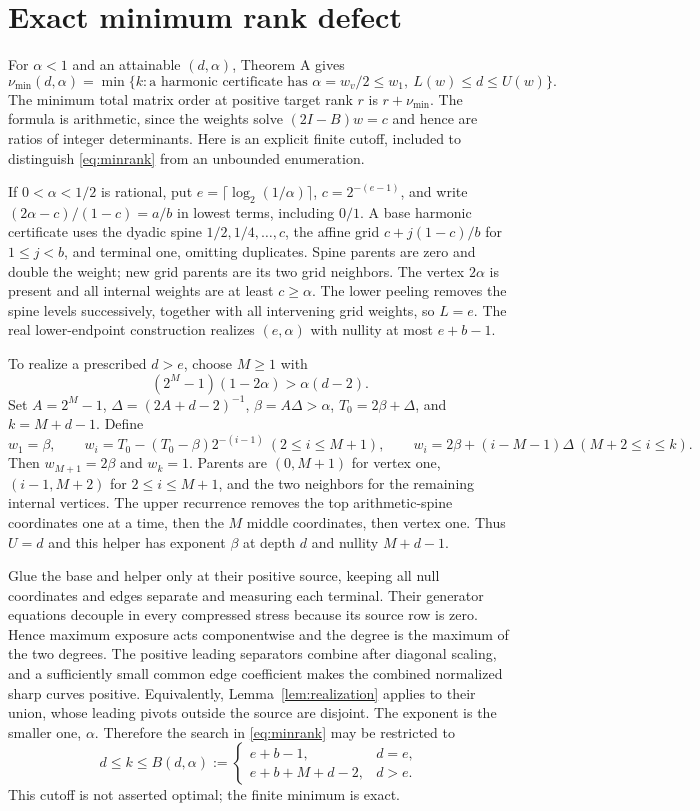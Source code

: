 \section{Exact minimum rank defect}\label{app:minimum}
For $\alpha<1$ and an attainable $(d,\alpha)$, Theorem A gives
\begin{equation}\label{eq:minrank}
\nu_{\min}(d,\alpha)=\min\{k:\text{a harmonic certificate has }
\alpha=w_v/2\le w_1,\ L(w)\le d\le U(w)\}.
\end{equation}
The minimum total matrix order at positive target rank $r$ is $r+\nu_{\min}$. The formula is arithmetic, since the weights solve $(2I-B)w=c$ and hence are ratios of integer determinants. Here is an explicit finite cutoff, included to distinguish \eqref{eq:minrank} from an unbounded enumeration.

If $0<\alpha<1/2$ is rational, put $e=\lceil\log_2(1/\alpha)\rceil$, $c=2^{-(e-1)}$, and write $(2\alpha-c)/(1-c)=a/b$ in lowest terms, including $0/1$. A base harmonic certificate uses the dyadic spine $1/2,1/4,\ldots,c$, the affine grid $c+j(1-c)/b$ for $1\le j<b$, and terminal one, omitting duplicates. Spine parents are zero and double the weight; new grid parents are its two grid neighbors. The vertex $2\alpha$ is present and all internal weights are at least $c\ge\alpha$. The lower peeling removes the spine levels successively, together with all intervening grid weights, so $L=e$. The real lower-endpoint construction realizes $(e,\alpha)$ with nullity at most $e+b-1$.

To realize a prescribed $d>e$, choose $M\ge1$ with
\[
(2^M-1)(1-2\alpha)>\alpha(d-2).
\]
Set $A=2^M-1$, $\Delta=(2A+d-2)^{-1}$, $\beta=A\Delta>\alpha$, $T_0=2\beta+\Delta$, and $k=M+d-1$. Define
\[
w_1=\beta,\qquad
w_i=T_0-(T_0-\beta)2^{-(i-1)}\ (2\le i\le M+1),
\qquad
w_i=2\beta+(i-M-1)\Delta\ (M+2\le i\le k).
\]
Then $w_{M+1}=2\beta$ and $w_k=1$. Parents are $(0,M+1)$ for vertex one, $(i-1,M+2)$ for $2\le i\le M+1$, and the two neighbors for the remaining internal vertices. The upper recurrence removes the top arithmetic-spine coordinates one at a time, then the $M$ middle coordinates, then vertex one. Thus $U=d$ and this helper has exponent $\beta$ at depth $d$ and nullity $M+d-1$.

Glue the base and helper only at their positive source, keeping all null coordinates and edges separate and measuring each terminal. Their generator equations decouple in every compressed stress because its source row is zero. Hence maximum exposure acts componentwise and the degree is the maximum of the two degrees. The positive leading separators combine after diagonal scaling, and a sufficiently small common edge coefficient makes the combined normalized sharp curves positive. Equivalently, Lemma~\ref{lem:realization} applies to their union, whose leading pivots outside the source are disjoint. The exponent is the smaller one, $\alpha$. Therefore the search in \eqref{eq:minrank} may be restricted to
\[
d\le k\le
B(d,\alpha):=
\begin{cases}
e+b-1,&d=e,\\
e+b+M+d-2,&d>e.
\end{cases}
\]
This cutoff is not asserted optimal; the finite minimum is exact.

